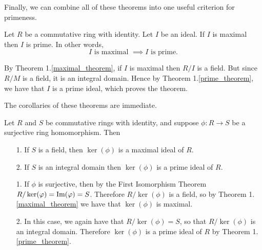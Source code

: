    Finally, we can combine all of these theorems into one useful
    criterion for primeness. 

    \begin{thm}
        Let $R$ be a commutative ring with identity. Let $I$ be an
        ideal. If $I$ is maximal then $I$ is prime. In other
        words, 
        \[
            I \text{ is maximal } \implies I \text{ is prime.}
        \]
        \vspace{-0.8cm}
    \end{thm}

    \begin{prf}
        By Theorem 1.\ref{maximal_theorem}, if $I$ is maximal then
        $R/I$ is a field. But since $R/M$ is a field, it is an
        integral domain. Hence by Theorem 1.\ref{prime_theorem},
        we have that $I$ is a prime ideal, which proves the theorem.
    \end{prf}

    The corollaries of these theorems are immediate. 

    \begin{corollary}
        Let $R$ and $S$ be commutative rings with identity, and suppose 
        $\phi: R \to S$ be a surjective ring homomorphism. Then 
        \begin{itemize}
            \item[1.] If $S$ is a field, then $\ker(\phi)$ is a
            maximal ideal of $R$. 
            \item[2.] If $S$ is an integral domain then
            $\ker(\phi)$ is a prime ideal of $R$. 
        \end{itemize}
    \end{corollary}

    \begin{prf}
        \begin{itemize}
            \item[1.] If $\phi$ is surjective, then by the First
            Isomorphism Theorem $R/\ker(\varphi) = \mbox{Im}(\varphi) = S$.
            Therefore $R/\ker(\phi)$ is a field, so by Theorem
            1.\ref{maximal_theorem} we have that $\ker(\phi)$ is
            maximal. 

            \item[2.] In this case, we again have that
            $R/\ker(\phi) = S$, so that $R/\ker(\phi)$ is an
            integral domain. Therefore $\ker(\phi)$ is a prime
            ideal of $R$ by Theorem 1.\ref{prime_theorem}.
        \end{itemize}
    \end{prf}
    
